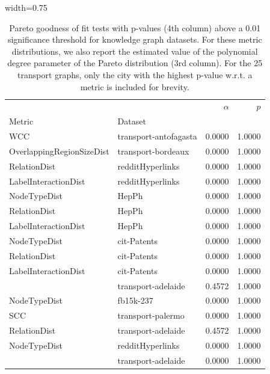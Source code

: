 \begin{table}[hb!]
    \centering
\caption[Pareto goodness of fit tests with p-values above a 0.01 significance threshold for knowledge graph datasets.]{Pareto goodness of fit tests with p-values (4th column) above a 0.01 significance threshold for knowledge graph datasets. For these metric distributions, we also report the estimated value of the polynomial degree parameter of the Pareto distribution (3rd column). For the 25 transport graphs, only the city with the highest p-value w.r.t. a metric is included for brevity.}
\label{tab:pareto}
\begin{adjustbox}{width=0.75\columnwidth}
\begin{tabular}{llrr}
\toprule
             &                   &  $\alpha$ &  $p$ \\
Metric & Dataset &              &               \\
\midrule
WCC & transport-antofagasta &       0.0000 &        1.0000 \\
OverlappingRegionSizeDist & transport-bordeaux &       0.0000 &        1.0000 \\
RelationDist & redditHyperlinks &       0.0000 &        1.0000 \\
LabelInteractionDist & redditHyperlinks &       0.0000 &        1.0000 \\
NodeTypeDist & HepPh &       0.0000 &        1.0000 \\
RelationDist & HepPh &       0.0000 &        1.0000 \\
LabelInteractionDist & HepPh &       0.0000 &        1.0000 \\
NodeTypeDist & cit-Patents &       0.0000 &        1.0000 \\
RelationDist & cit-Patents &       0.0000 &        1.0000 \\
LabelInteractionDist & cit-Patents &       0.0000 &        1.0000 \\
             & transport-adelaide &       0.4572 &        1.0000 \\
NodeTypeDist & fb15k-237 &       0.0000 &        1.0000 \\
SCC & transport-palermo &       0.0000 &        1.0000 \\
RelationDist & transport-adelaide &       0.4572 &        1.0000 \\
NodeTypeDist & redditHyperlinks &       0.0000 &        1.0000 \\
             & transport-adelaide &       0.0000 &        1.0000 \\

\end{tabular}
\end{adjustbox}
\end{table}

